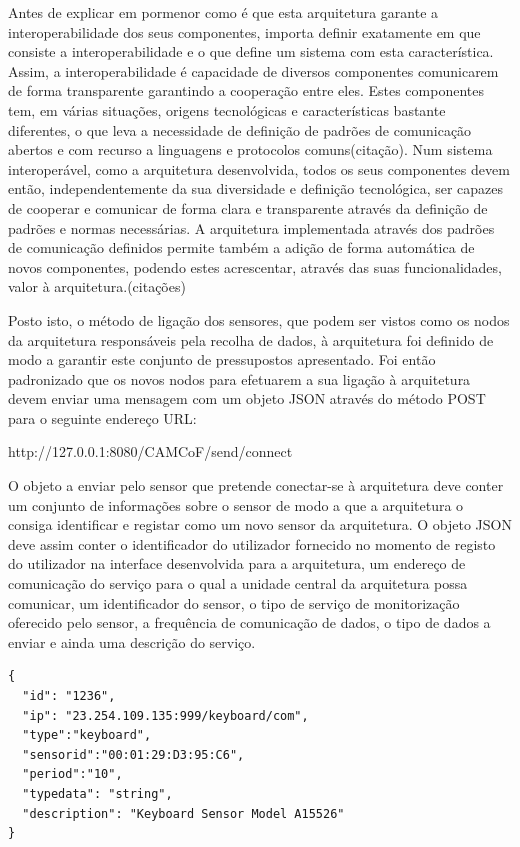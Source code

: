 Antes de explicar em pormenor como é que esta arquitetura garante a interoperabilidade dos seus componentes, importa definir exatamente em que consiste a interoperabilidade e o que define um sistema com esta característica. Assim, a interoperabilidade é capacidade de diversos componentes comunicarem de forma transparente garantindo a cooperação entre eles. Estes componentes tem, em várias situações, origens tecnológicas e características bastante diferentes, o que leva a necessidade de definição de padrões de comunicação abertos e com recurso a linguagens e protocolos comuns(citação). Num sistema interoperável, como a arquitetura desenvolvida, todos os seus componentes devem então, independentemente da sua diversidade e definição tecnológica, ser capazes de cooperar e comunicar de forma clara e transparente através da definição de padrões e normas necessárias. A arquitetura implementada através dos padrões de comunicação definidos permite também a adição de forma automática de novos componentes, podendo estes acrescentar, através das suas funcionalidades, valor à arquitetura.(citações)

Posto isto, o método de ligação dos sensores, que podem ser vistos como os nodos da arquitetura responsáveis pela recolha de dados, à arquitetura foi definido de modo a garantir este conjunto de pressupostos apresentado. Foi então padronizado que os novos nodos para efetuarem a sua ligação à arquitetura devem enviar uma mensagem com um objeto JSON através do método POST para o seguinte endereço URL:

http://127.0.0.1:8080/CAMCoF/send/connect

O objeto a enviar pelo sensor que pretende conectar-se à arquitetura deve conter um conjunto de informações sobre o sensor de modo a que a arquitetura o consiga identificar e registar como um novo sensor da arquitetura. O objeto JSON deve assim conter o identificador do utilizador fornecido no momento de registo do utilizador na interface desenvolvida para a arquitetura, um endereço de comunicação do serviço para o qual a unidade central da arquitetura possa comunicar, um identificador do sensor, o tipo de serviço de monitorização oferecido pelo sensor, a frequência de comunicação de dados, o tipo de dados a enviar e ainda uma descrição do serviço.

\begin{lstlisting}[caption=Exemplo de objeto JSON enviado por Sensor de Teclado]
{
  "id": "1236",
  "ip": "23.254.109.135:999/keyboard/com",
  "type":"keyboard",
  "sensorid":"00:01:29:D3:95:C6",
  "period":"10",
  "typedata": "string",
  "description": "Keyboard Sensor Model A15526"
}
\end{lstlisting}

